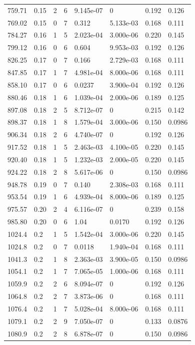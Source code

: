 \documentclass[preview]{standalone}
\begin{document}
{{{\begin{tabular}{L{1.2cm}C{1.2cm} C{0.3cm}C{0.5cm} C{1.4cm}C{1.4cm} C{1.4cm}C{1.4cm}}
  759.71  &  0.15  & 2     &  6 &  9.145e-07  & 0  & 0.192 &  0.126   \\ 
  769.02  &  0.15  & 0     &  7 &  0.312  & 5.133e-03  & 0.168 &  0.111   \\ 
  784.27  &  0.16  & 1     &  5 &  2.023e-04  & 3.000e-06  & 0.220 &  0.145   \\ 
  799.12  &  0.16  & 0     &  6 &  0.604  & 9.953e-03  & 0.192 &  0.126   \\ 
  826.25  &  0.17  & 0     &  7 &  0.166  & 2.729e-03  & 0.168 &  0.111   \\ 
  847.85  &  0.17  & 1     &  7 &  4.981e-04  & 8.000e-06  & 0.168 &  0.111   \\ 
  858.10  &  0.17  & 0     &  6 &  0.0237  & 3.900e-04  & 0.192 &  0.126   \\ 
  880.46  &  0.18  & 1     &  6 &  1.039e-04  & 2.000e-06  & 0.189 &  0.125   \\ 
  897.08  &  0.18  & 2     &  5 &  8.712e-07  & 0  & 0.215 &  0.142   \\ 
  898.37  &  0.18  & 1     &  8 &  1.579e-04  & 3.000e-06  & 0.150 &  0.0986   \\ 
  906.34  &  0.18  & 2     &  6 &  4.740e-07  & 0  & 0.192 &  0.126   \\ 
  917.52  &  0.18  & 1     &  5 &  2.463e-03  & 4.100e-05  & 0.220 &  0.145   \\ 
  920.40  &  0.18  & 1     &  5 &  1.232e-03  & 2.000e-05  & 0.220 &  0.145   \\ 
  924.22  &  0.18  & 2     &  8 &  5.617e-06  & 0  & 0.150 &  0.0986   \\ 
  948.78  &  0.19  & 0     &  7 &  0.140  & 2.308e-03  & 0.168 &  0.111   \\ 
  953.54  &  0.19  & 1     &  6 &  4.939e-04  & 8.000e-06  & 0.189 &  0.125   \\ 
  975.57  &  0.20  & 2     &  4 &  6.116e-07  & 0  & 0.239 &  0.158   \\ 
  985.80  &  0.20  & 0     &  6 &  1.04  & 0.0170  & 0.192 &  0.126   \\ 
  1024.4  &   0.2  & 1     &  5 &  1.542e-04  & 3.000e-06  & 0.220 &  0.145   \\ 
  1024.8  &   0.2  & 0     &  7 &  0.0118  & 1.940e-04  & 0.168 &  0.111   \\ 
  1041.3  &   0.2  & 1     &  8 &  2.363e-03  & 3.900e-05  & 0.150 &  0.0986   \\ 
  1054.1  &   0.2  & 1     &  7 &  7.065e-05  & 1.000e-06  & 0.168 &  0.111   \\ 
  1059.9  &   0.2  & 2     &  6 &  8.094e-07  & 0  & 0.192 &  0.126   \\ 
  1064.8  &   0.2  & 2     &  7 &  3.873e-06  & 0  & 0.168 &  0.111   \\ 
  1076.4  &   0.2  & 1     &  7 &  5.028e-04  & 8.000e-06  & 0.168 &  0.111   \\ 
  1079.1  &   0.2  & 2     &  9 &  7.050e-07  & 0  & 0.133 &  0.0876   \\ 
  1080.9  &   0.2  & 2     &  8 &  6.878e-07  & 0  & 0.150 &  0.0986   \\ 
\hline 
\end{tabular} 

}}}
\end{document}
